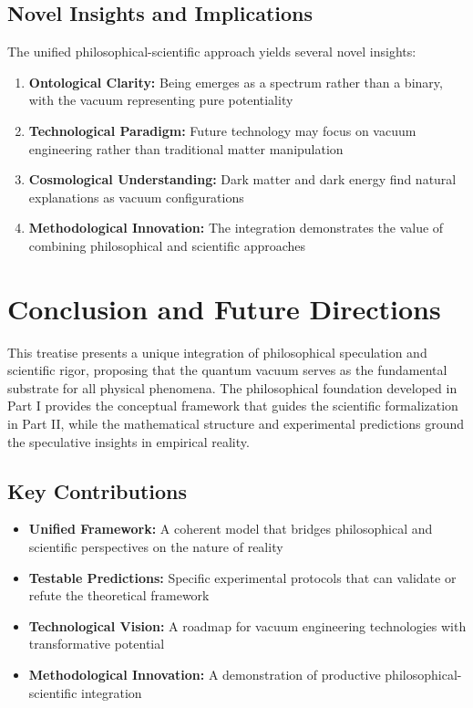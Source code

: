 \documentclass[12pt,a4paper]{article}
\begin{document}
\subsection{Novel Insights and Implications}

The unified philosophical-scientific approach yields several novel insights:

\begin{enumerate}
    \item \textbf{Ontological Clarity:} Being emerges as a spectrum rather than a binary, with the vacuum representing pure potentiality
    \item \textbf{Technological Paradigm:} Future technology may focus on vacuum engineering rather than traditional matter manipulation
    \item \textbf{Cosmological Understanding:} Dark matter and dark energy find natural explanations as vacuum configurations
    \item \textbf{Methodological Innovation:} The integration demonstrates the value of combining philosophical and scientific approaches
\end{enumerate}

\section{Conclusion and Future Directions}

This treatise presents a unique integration of philosophical speculation and scientific rigor, proposing that the quantum vacuum serves as the fundamental substrate for all physical phenomena. The philosophical foundation developed in Part I provides the conceptual framework that guides the scientific formalization in Part II, while the mathematical structure and experimental predictions ground the speculative insights in empirical reality.

\subsection{Key Contributions}

\begin{itemize}
    \item \textbf{Unified Framework:} A coherent model that bridges philosophical and scientific perspectives on the nature of reality
    \item \textbf{Testable Predictions:} Specific experimental protocols that can validate or refute the theoretical framework
    \item \textbf{Technological Vision:} A roadmap for vacuum engineering technologies with transformative potential
    \item \textbf{Methodological Innovation:} A demonstration of productive philosophical-scientific integration
\end{itemize}
\end{document}
